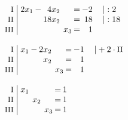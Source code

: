 \begin{equation*}
\begin{array}{l}
\begin{array}{r|rcrcrcrl}
\end{array}
\\ \\
\setlength{\arraycolsep}{1pt}
\begin{array}{r|rcrcrcrl}
    \text{\small I } &\; 2x_{1} & - &  4x_{2} &  &       & = & -2 & \quad|:2  \\
   \text{\small II } &\;        &   & 18x_{2} &  &       & = & 18 & \quad|:18 \\
  \text{\small III } &\;        &   &         &  & x_{3} & = &  1 &             
\end{array}
\\ \\
\setlength{\arraycolsep}{1pt}
\begin{array}{r|rcrcrcrl}
    \text{\small I } &\; x_{1} & - & 2x_{2} &  &       & = & -1 & \quad|+2\cdot\text{\small II} \\
   \text{\small II } &\;       &   &  x_{2} &  &       & = &  1 &                               \\
  \text{\small III } &\;       &   &        &  & x_{3} & = &  1 &                                 
\end{array}
\\ \\
\setlength{\arraycolsep}{1pt}
\begin{array}{r|rcrcrcrl}
    \text{\small I } &\; x_{1} &  &       &  &       & = & 1 & \\
   \text{\small II } &\;       &  & x_{2} &  &       & = & 1 & \\
  \text{\small III } &\;       &  &       &  & x_{3} & = & 1 &   
\end{array}
\end{array}
\end{equation*}

